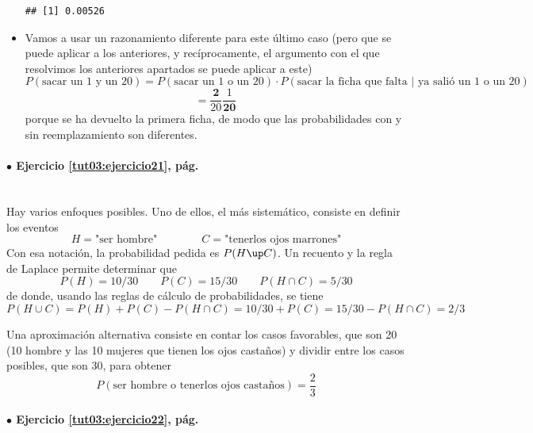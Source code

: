 \documentclass[10pt,a4paper]{article}\usepackage[]{graphicx}\usepackage[]{color}
\makeatletter
\newenvironment{kframe}{%
 \def\at@end@of@kframe{}%
 \ifinner\ifhmode%
  \def\at@end@of@kframe{\end{minipage}}%
  \begin{minipage}{\columnwidth}%
 \fi\fi%
 \def\FrameCommand##1{\hskip\@totalleftmargin \hskip-\fboxsep
 \colorbox{shadecolor}{##1}\hskip-\fboxsep
     \hskip-\linewidth \hskip-\@totalleftmargin \hskip\columnwidth}%
 \MakeFramed {\advance\hsize-\width
   \@totalleftmargin\z@ \linewidth\hsize
   \@setminipage}}%
 {\par\unskip\endMakeFramed%
 \at@end@of@kframe}
\newenvironment{knitrout}{}{} %
\newcounter {cont01}
\makeatother
\begin{document}
\begin{itemize}
\begin{knitrout}
\begin{kframe}
\begin{alltt}
\end{alltt}
\begin{verbatim}
## [1] 0.00526
\end{verbatim}
\end{kframe}
\end{knitrout}
\item Vamos a usar un razonamiento diferente para este último caso (pero que se puede aplicar a los anteriores, y recíprocamente, el argumento con el que resolvimos los anteriores apartados se puede aplicar a este) 
$$P(\text{sacar un 1 y un 20}) = P(\text{sacar un 1 o un 20})· 
P(\text{sacar la ficha que falta | ya salió un 1 o un 20})$$
$$=\frac{\textbf{2}}{20}\frac{1}{\textbf{20}} $$
porque se ha devuelto la primera ficha, de modo que las probabilidades con y sin reemplazamiento son diferentes.
\end{itemize}

\paragraph{\bf $\bullet$ Ejercicio \ref{tut03:ejercicio21}, pág. \pageref{tut03:ejercicio21}}
\label{tut03:ejercicio21:sol}\quad\\
Hay varios enfoques posibles. Uno de ellos, el m\'as sistem\'atico, 
consiste en definir los eventos 
\[H=\text{"ser hombre"}\qquad\qquad
  C=\text{"tenerlos ojos marrones"}\]
Con esa notaci\'on, la probabilidad pedida es $P(H\up C)$. 
Un recuento y la regla de Laplace permite determinar que 
\[P(H)=10/30\qquad P(C)=15/30\qquad P(H\cap C)=5/30\]
de donde, usando las reglas de c\'alculo de probabilidades, 
se tiene 
\[P(H\cup C)=P(H)+P(C)-P(H\cap C)=10/30+P(C)=15/30- P(H\cap C)=2/3\]

Una aproximaci\'on alternativa consiste en contar los casos favorables, que son 20 (10 hombre y las 10 mujeres que tienen los ojos castaños) y dividir entre los casos posibles, que son 30, para obtener $$P(\text{ser hombre o tenerlos ojos castaños})=\frac{2}{3}$$


\paragraph{\bf $\bullet$ Ejercicio \ref{tut03:ejercicio22}, pág. \pageref{tut03:ejercicio22}}
\label{tut03:ejercicio22:sol}\quad\\
\end{document}
